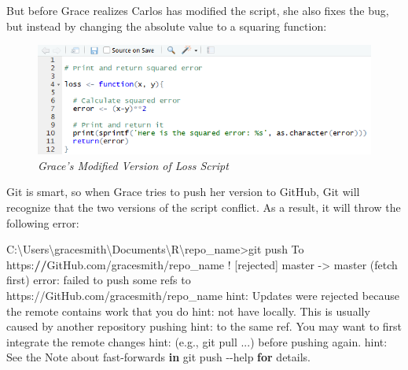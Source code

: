 \documentclass[
]{book}
\newenvironment{Shaded}{\begin{snugshade}}{\end{snugshade}}
\newcommand{\ControlFlowTok}[1]{\textcolor[rgb]{0.13,0.29,0.53}{\textbf{#1}}}
\newcommand{\ErrorTok}[1]{\textcolor[rgb]{0.64,0.00,0.00}{\textbf{#1}}}
\newcommand{\FunctionTok}[1]{\textcolor[rgb]{0.00,0.00,0.00}{#1}}
\newcommand{\NormalTok}[1]{#1}
\newcommand{\OtherTok}[1]{\textcolor[rgb]{0.56,0.35,0.01}{#1}}
\newcommand{\SpecialCharTok}[1]{\textcolor[rgb]{0.00,0.00,0.00}{#1}}
\newcommand{\StringTok}[1]{\textcolor[rgb]{0.31,0.60,0.02}{#1}}
\begin{document}
But before Grace realizes Carlos has modified the script, she also fixes the bug, but instead by changing the absolute value to a squaring function:

\begin{figure}
\centering
\includegraphics{images/lossGrace.PNG}
\caption{\emph{Grace's Modified Version of Loss Script}}
\end{figure}

Git is smart, so when Grace tries to push her version to GitHub, Git will recognize that the two versions of the script conflict. As a result, it will throw the following error:

\begin{Shaded}
\begin{Highlighting}[]
\NormalTok{C}\SpecialCharTok{:}\NormalTok{\textbackslash{}Users\textbackslash{}gracesmith\textbackslash{}Documents\textbackslash{}R\textbackslash{}repo\_name}\SpecialCharTok{\textgreater{}}\NormalTok{git push}
\NormalTok{To https}\SpecialCharTok{:}\ErrorTok{//}\NormalTok{GitHub.com}\SpecialCharTok{/}\NormalTok{gracesmith}\SpecialCharTok{/}\NormalTok{repo\_name}
 \SpecialCharTok{!}\NormalTok{ [rejected]        master }\OtherTok{{-}\textgreater{}} \FunctionTok{master}\NormalTok{ (fetch first)}
\NormalTok{error}\SpecialCharTok{:}\NormalTok{ failed to push some refs to }\StringTok{\textquotesingle{}https://GitHub.com/gracesmith/repo\_name\textquotesingle{}}
\NormalTok{hint}\SpecialCharTok{:}\NormalTok{ Updates were rejected because the remote contains work that you do}
\NormalTok{hint}\SpecialCharTok{:}\NormalTok{ not have locally. This is usually caused by another repository pushing}
\NormalTok{hint}\SpecialCharTok{:}\NormalTok{ to the same ref. You may want to first integrate the remote changes}
\NormalTok{hint}\SpecialCharTok{:}\NormalTok{ (e.g., }\StringTok{\textquotesingle{}git pull ...\textquotesingle{}}\NormalTok{) before pushing again.}
\NormalTok{hint}\SpecialCharTok{:}\NormalTok{ See the }\StringTok{\textquotesingle{}Note about fast{-}forwards\textquotesingle{}} \ControlFlowTok{in} \StringTok{\textquotesingle{}git push {-}{-}help\textquotesingle{}} \ControlFlowTok{for}\NormalTok{ details.}
\end{Highlighting}
\end{Shaded}
\end{document}
